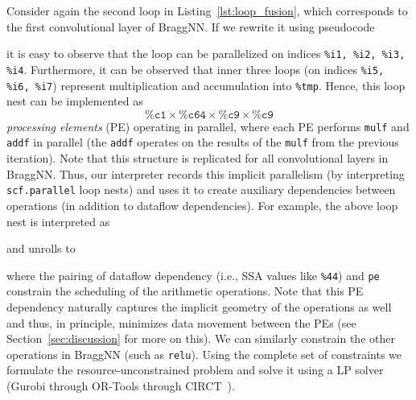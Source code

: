 Consider again the second loop in Listing~\ref{lst:loop_fusion}, which corresponds to the first convolutional layer of BraggNN.
If we rewrite it using pseudocode
\begin{mylistingnocap}
	
\end{mylistingnocap}
\noindent it is easy to observe that the loop can be parallelized on indices \texttt{\%i1, \%i2, \%i3, \%i4}.
Furthermore, it can be observed that inner three loops (on indices \texttt{\%i5, \%i6, \%i7}) represent multiplication and accumulation into \texttt{\%tmp}.
Hence, this loop nest can be implemented as 
\[
	\mathtt{\%c1} \times \mathtt{\%c64} \times \mathtt{\%c9} \times \mathtt{\%c9}
\]
\emph{processing elements} (PE) operating in parallel, where each PE performs \texttt{mulf} and \texttt{addf} in parallel (the \texttt{addf} operates on the results of the \texttt{mulf} from the previous iteration).
Note that this structure is replicated for all convolutional layers in BraggNN.
Thus, our interpreter records this implicit parallelism (by interpreting \texttt{scf.parallel} loop nests) and uses it to create auxiliary dependencies between operations (in addition to dataflow dependencies).
For example, the above loop nest is interpreted as 
\begin{mylistingnocap}
	
\end{mylistingnocap}
\noindent and unrolls to 
\begin{mylistingnocap}
	
\end{mylistingnocap}
\noindent where the pairing of dataflow dependency (i.e., SSA values like \texttt{\%44}) and \texttt{pe} constrain the scheduling of the arithmetic operations.
Note that this PE dependency naturally captures the implicit geometry of the operations as well and thus, in principle, minimizes data movement between the PEs (see Section~\ref{sec:discussion} for more on this).
We can similarly constrain the other operations in BraggNN (such as \texttt{relu}).
Using the complete set of constraints we formulate the resource-unconstrained problem and solve it using a LP solver (Gurobi through OR-Tools through CIRCT~\cite{CIRCTHardwareDesign}).

